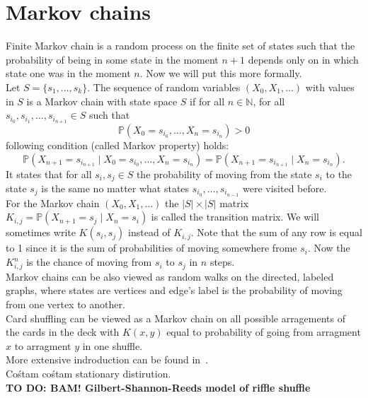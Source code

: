 \documentclass[a4paper, 12pt]{report}
\newcommand{\todo}[1]{\hfill \break \textbf{\Huge TO DO: #1 \hfill \break}\normalsize}
\begin{document}
\chapter{Markov chains}
\setcounter{page}{5}
Finite Markov chain is a random process on the finite set of states such that
the probability of being in some state in the moment $n+1$ depends only on in which state one was
in the moment $n$. Now we will put this more formally.\\
Let $S = \{s_1, \dots, s_k\}$. The sequence of random variables $(X_0, X_1, \dots)$ with values in $S$
is a Markov chain with state space $S$ if for all $n \in \mathbb{N}$,
for all $s_{i_0}, s_{i_1}, \dots, s_{i_{n+1}} \in S$ such that
\begin{equation*}
\mathbb{P}(X_0 = s_{i_0}, \dots, X_n = s_{i_n}) > 0
\end{equation*}
following condition (called Markov property) holds:
\begin{equation}
\mathbb{P}(X_{n+1} = s_{i_{n+1}} \mid X_0 = s_{i_0}, \dots, X_n = s_{i_n}) =
\mathbb{P}(X_{n+1} = s_{i_{n+1}} \mid X_n = s_{i_n}).
\end{equation}
It states that for all $s_i, s_j \in S$ the probability of moving from the state
$s_i$ to the state $s_j$ is the same no matter what states $s_{i_0}, \dots, s_{i_{n-1}}$
were visited before. \\
For the Markov chain $(X_0, X_1, \dots)$ the $|S| \times |S|$ matrix
$K_{i,j} = \mathbb{P}(X_{n+1} = s_j \mid X_n = s_i)$ is called the transition matrix. We will sometimes
write $K(s_i, s_j)$ instead of $K_{i,j}$. Note that the sum of
any row is equal to 1 since it is the sum of probabilities of moving somewhere frome $s_i$.
Now the $K^n_{i,j}$ is the chance of moving from $s_i$ to $s_j$ in $n$ steps. \\
Markov chains can be also viewed as random walks on the directed, labeled graphs, where states are vertices
and edge's label is the probability of moving from one vertex to another. \\
Card shuffling can be viewed as a Markov chain on all possible arragements of the cards
in the deck with $K(x,y)$ equal to probability of going from arragment $x$ to arragment $y$ in one shuffle. 
\\ More extensive indroduction can be found in~\cite{LePeWi}. \\
Cośtam cośtam stationary distirution. \\
\todo{BAM! Gilbert-Shannon-Reeds model of riffle shuffle}
\end{document}
